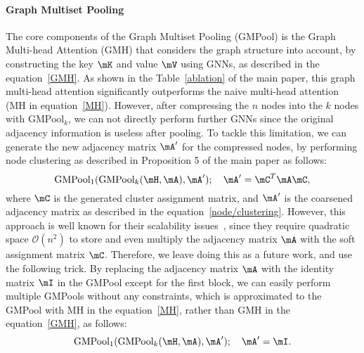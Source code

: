 \paragraph{Graph Multiset Pooling} The core components of the Graph Multiset Pooling (GMPool) is the Graph Multi-head Attention (GMH) that considers the graph structure into account, by constructing the key $\mK$ and value $\mV$ using GNNs, as described in the equation~\ref{GMH}. As shown in the Table~\ref{ablation} of the main paper, this graph multi-head attention significantly outperforms the naive multi-head attention (MH in equation~\ref{MH}). However, after compressing the $n$ nodes into the $k$ nodes with $\text{GMPool}_k$, we can not directly perform further GNNs since the original adjacency information is useless after pooling. To tackle this limitation, we can generate the new adjacency matrix $\mA'$ for the compressed nodes, by performing node clustering as described in Proposition 5 of the main paper as follows:
\begin{equation}
    \text{GMPool}_{1}(\text{GMPool}_{k}(\mH, \mA), \mA'); \quad \mA' = \mC^T \mA \mC,
\end{equation}
where $\mC$ is the generated cluster assignment matrix, and $\mA'$ is the coarsened adjacency matrix as described in the equation~\ref{node/clustering}. However, this approach is well known for their scalability issues~\citep{SAGPool, GNN/sparse/pooling:Readout}, since they require quadratic space $\mathcal{O}(n^2)$ to store and even multiply the adjacency matrix $\mA$ with the soft assignment matrix $\mC$. Therefore, we leave doing this as a future work, and use the following trick. By replacing the adjacency matrix $\mA$ with the identity matrix $\mI$ in the GMPool except for the first block, we can easily perform multiple GMPools without any constraints, which is approximated to the GMPool with MH in the equation~\ref{MH}, rather than GMH in the equation~\ref{GMH}, as follows:
\begin{equation}
    \text{GMPool}_{1}(\text{GMPool}_{k}(\mH, \mA), \mA'); \quad \mA' = \mI.
\end{equation}

